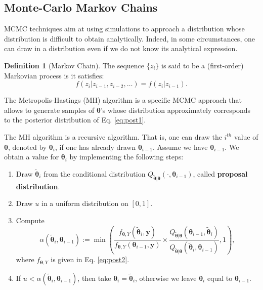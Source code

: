 \documentclass[
  12pt,
]{book}
\providecommand{\tightlist}{%
  \setlength{\itemsep}{0pt}\setlength{\parskip}{0pt}}
\theoremstyle{definition}
\newtheorem{definition}{Definition}[chapter]
\theoremstyle{definition}
\theoremstyle{definition}
\theoremstyle{definition}
\theoremstyle{remark}
\begin{document}
\hypertarget{monte-carlo-markov-chains}{%
\subsection{Monte-Carlo Markov Chains}\label{monte-carlo-markov-chains}}

MCMC techniques aim at using simulations to approach a distribution whose distribution is difficult to obtain analytically. Indeed, in some circumstances, one can draw in a distribution even if we do not know its analytical expression.

\begin{definition}[Markov Chain]
\protect\hypertarget{def:MC}{}\label{def:MC}The sequence \(\{z_i\}\) is said to be a (first-order) Markovian process is it satisfies:
\[
f(z_i|z_{i-1},z_{i-2},\dots) = f(z_i|z_{i-1}).
\]
\end{definition}

The Metropolis-Hastings (MH) algorithm is a specific MCMC approach that allows to generate samples of \({\boldsymbol\theta}\)'s whose distribution approximately corresponds to the posterior distribution of Eq. \eqref{eq:post1}.

The MH algorithm is a recursive algorithm. That is, one can draw the \(i^{th}\) value of \({\boldsymbol\theta}\), denoted by \({\boldsymbol\theta}_i\), if one has already drawn \({\boldsymbol\theta}_{i-1}\). Assume we have \({\boldsymbol\theta}_{i-1}\). We obtain a value for \({\boldsymbol\theta}_i\) by implementing the following steps:

\begin{enumerate}
\def\labelenumi{\arabic{enumi}.}
\tightlist
\item
  Draw \(\tilde{{\boldsymbol\theta}}_i\) from the conditional distribution \(Q_{\tilde{{\boldsymbol\theta}}|{\boldsymbol\theta}}(\cdot,{\boldsymbol\theta}_{i-1})\), called \textbf{proposal distribution}.
\item
  Draw \(u\) in a uniform distribution on \([0,1]\).
\item
  Compute
  \begin{equation}
  \alpha(\tilde{{\boldsymbol\theta}}_i,{\boldsymbol\theta}_{i-1}):= \min\left(\frac{f_{{\boldsymbol\theta},Y}(\tilde{{\boldsymbol\theta}}_i,\mathbf{y})}{f_{{\boldsymbol\theta},Y}({\boldsymbol\theta}_{i-1},\mathbf{y})}\times\frac{Q_{\tilde{{\boldsymbol\theta}}|{\boldsymbol\theta}}({\boldsymbol\theta}_{i-1},\tilde{{\boldsymbol\theta}}_i)}{Q_{\tilde{{\boldsymbol\theta}}|{\boldsymbol\theta}}(\tilde{{\boldsymbol\theta}}_i,{\boldsymbol\theta}_{i-1})},1\right),\label{eq:alphaXXX}
  \end{equation}
  where \(f_{{\boldsymbol\theta},Y}\) is given in Eq. \eqref{eq:post2}.
\item
  If \(u<\alpha(\tilde{{\boldsymbol\theta}}_i,{\boldsymbol\theta}_{i-1})\), then take \({\boldsymbol\theta}_i = \tilde{{\boldsymbol\theta}}_i\), otherwise we leave \({\boldsymbol\theta}_i\) equal to \({\boldsymbol\theta}_{i-1}\).
\end{enumerate}
\end{document}
